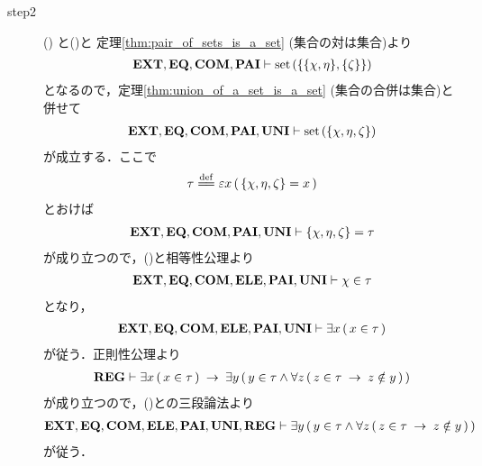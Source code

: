 \begin{sketch}
\begin{description}
			\item[step2] ()
				と()と
				定理\ref{thm:pair_of_sets_is_a_set} (集合の対は集合)より
				\begin{align}
					\mbox{{\bf EXT}},\mbox{{\bf EQ}},\mbox{\bf COM},\mbox{{\bf PAI}} \vdash 
					\operatorname*{set}\hspace{0.15em}(\{\{\chi,\eta\},\{\zeta\}\})
				\end{align}
				となるので，定理\ref{thm:union_of_a_set_is_a_set} (集合の合併は集合)と併せて
				\begin{align}
					\mbox{{\bf EXT}},\mbox{{\bf EQ}},\mbox{\bf COM},\mbox{{\bf PAI}},\mbox{{\bf UNI}} \vdash 
					\operatorname*{set}\hspace{0.15em}(\{\chi,\eta,\zeta\})
				\end{align}
				が成立する．ここで
				\begin{align}
					\tau \defeq \varepsilon x\, (\, \{\chi,\eta,\zeta\} = x\, )
					\label{fom:no_three_sets_go_round_9}
				\end{align}
				とおけば
				\begin{align}
					\mbox{{\bf EXT}},\mbox{{\bf EQ}},\mbox{\bf COM},\mbox{{\bf PAI}},\mbox{{\bf UNI}} \vdash 
					\{\chi,\eta,\zeta\} = \tau
					\label{fom:no_three_sets_go_round_10}
				\end{align}
				が成り立つので，()と相等性公理より
				\begin{align}
					\mbox{{\bf EXT}},\mbox{{\bf EQ}},\mbox{\bf COM},\mbox{{\bf ELE}},\mbox{{\bf PAI}},\mbox{{\bf UNI}} \vdash \chi \in \tau
					\label{fom:no_three_sets_go_round_11}
				\end{align}
				となり，
				\begin{align}
					\mbox{{\bf EXT}},\mbox{{\bf EQ}},\mbox{\bf COM},\mbox{{\bf ELE}},\mbox{{\bf PAI}},\mbox{{\bf UNI}} \vdash 
					\exists x\, (\, x \in \tau\, )
					\label{fom:no_three_sets_go_round_12}
				\end{align}
				が従う．正則性公理より
				\begin{align}
					\mbox{{\bf REG}} \vdash \exists x\, (\, x \in \tau\, )
					\hspace{0.25em}\rightarrow\hspace{0.25em} \exists y\, (\, y \in \tau \wedge \forall z\, (\, z \in \tau \hspace{0.25em}\rightarrow\hspace{0.25em} z \notin y\, )\, )
				\end{align}
				が成り立つので，()との三段論法より
				\begin{align}
					\mbox{{\bf EXT}},\mbox{{\bf EQ}},\mbox{\bf COM},\mbox{{\bf ELE}},\mbox{{\bf PAI}},\mbox{{\bf UNI}},\mbox{{\bf REG}} \vdash 
					\exists y\, (\, y \in \tau \wedge \forall z\, (\, z \in \tau \hspace{0.25em}\rightarrow\hspace{0.25em} z \notin y\, )\, )
					\label{fom:no_three_sets_go_round_22}
				\end{align}
				が従う．
				

\end{description}
\end{sketch}
